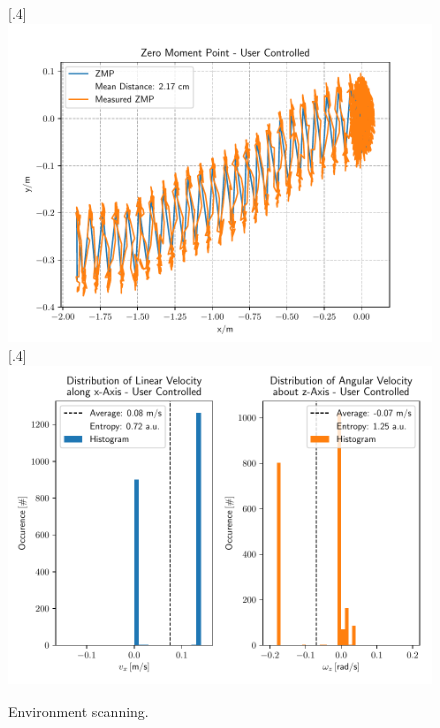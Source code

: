 \begin{figure}[h]
	\centering
	[.4\linewidth]{\includegraphics[scale=.35]{chapters/05_experiments/01_user_controlled_walking/02_test_environment/out_of_sight_walk_01_zmp.pdf}}
	[.4\linewidth]{\includegraphics[scale=.35]{chapters/05_experiments/01_user_controlled_walking/02_test_environment/out_of_sight_walk_01_entropy.pdf}}
	\caption{Environment scanning.}
	\label{fig::512_uc_sight}
\end{figure} 